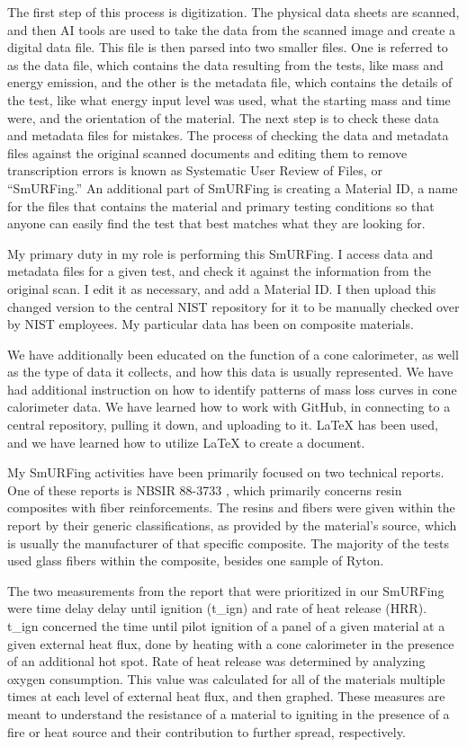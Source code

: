 \documentclass{abstract}
\begin{document}
 The first step of this process is digitization. The physical data sheets are scanned, and then AI tools are used to take the data from the scanned image and create a digital data file. This file is then parsed into two smaller files. One is referred to as the data file, which contains the data resulting from the tests, like mass and energy emission, and the other is the metadata file, which contains the details of the test, like what energy input level was used, what the starting mass and time were, and the orientation of the material. The next step is to check these data and metadata files for mistakes. The process of checking the data and metadata files against the original scanned documents and editing them to remove transcription errors is known as Systematic User Review of Files, or “SmURFing.” An additional part of SmURFing is creating a Material ID, a name for the files that contains the material and primary testing conditions so that anyone can easily find the test that best matches what they are looking for.
 
 My primary duty in my role is performing this SmURFing. I access data and metadata files for a given test, and check it against the information from the original scan. I edit it as necessary, and add a Material ID. I then upload this changed version to the central NIST repository for it to be manually checked over by NIST employees. My particular data has been on composite materials. 
 
 We have additionally been educated on the function of a cone calorimeter, as well as the type of data it collects, and how this data is usually represented. We have had additional instruction on how to identify patterns of mass loss curves in cone calorimeter data. We have learned how to work with GitHub, in connecting to a central repository, pulling it down, and uploading to it. LaTeX has been used, and we have learned how to utilize LaTeX to create a document. 
 
 My SmURFing activities have been primarily focused on two technical reports. One of these reports is NBSIR 88-3733 \cite{NBSIR883733}, which primarily concerns resin composites with fiber reinforcements. The resins and fibers were given within the report by their generic classifications, as provided by the material's source, which is usually the manufacturer of that specific composite. The majority of the tests used glass fibers within the composite, besides one sample of Ryton. 
 
 The two measurements from the report that were prioritized in our SmURFing were time delay delay until ignition (t\_ign) and rate of heat release (HRR). t\_ign concerned the time until pilot ignition of a panel of a given material at a given external heat flux, done by heating with a cone calorimeter in the presence of an additional hot spot. Rate of heat release was determined by analyzing oxygen consumption. This value was calculated for all of the materials multiple times at each level of external heat flux, and then graphed. These measures are meant to understand the resistance of a material to igniting in the presence of a fire or heat source and their contribution to further spread, respectively.  
 
\end{document}
